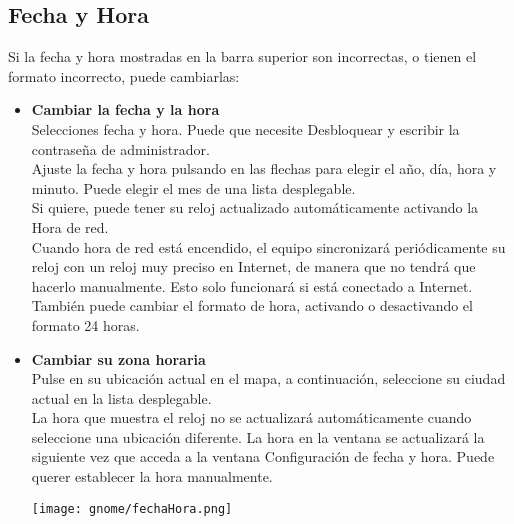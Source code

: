 	\subsection{Fecha y Hora}
	Si la fecha y hora mostradas en la barra superior son incorrectas, o tienen el formato incorrecto, puede cambiarlas:\\
\begin{itemize}
\item {\large \bf Cambiar la fecha y la hora}\\
Selecciones fecha y hora.
Puede que necesite Desbloquear y escribir la contraseña de administrador.\\
Ajuste la fecha y hora pulsando en las flechas para elegir el año, día, hora y minuto. Puede elegir el mes de una lista desplegable.\\
Si quiere, puede tener su reloj actualizado automáticamente activando la Hora de red.\\
Cuando hora de red está encendido, el equipo sincronizará periódicamente su reloj con un reloj muy preciso en Internet, de manera que no tendrá que hacerlo manualmente. Esto solo funcionará si está conectado a Internet.\\
También puede cambiar el formato de hora, activando o desactivando el formato 24 horas.
\item {\large \bf Cambiar su zona horaria}\\
Pulse en su ubicación actual en el mapa, a continuación, seleccione su ciudad actual en la lista desplegable.\\
La hora que muestra el reloj no se actualizará automáticamente cuando seleccione una ubicación diferente. La hora en la ventana se actualizará la siguiente vez que acceda a la ventana Configuración de fecha y hora. Puede querer establecer la hora manualmente.
		\begin{center}
			\texttt{[image: gnome/fechaHora.png]} 
		\end{center}
\end{itemize}